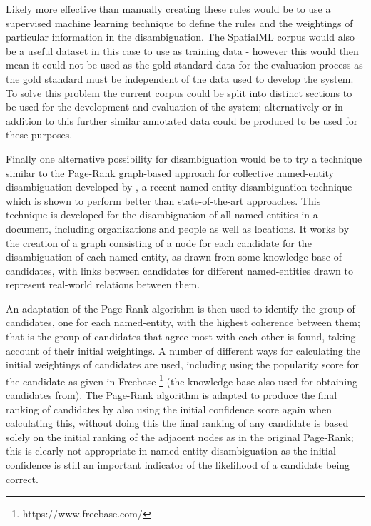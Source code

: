 \documentclass[12pt, a4paper]{report}
\begin{document}
Likely more effective than manually creating these rules would be to use a supervised machine learning technique to define the rules and the weightings of particular information in the disambiguation. The SpatialML corpus would also be a useful dataset in this case to use as training data - however this would then mean it could not be used as the gold standard data for the evaluation process as the gold standard must be independent of the data used to develop the system. To solve this problem the current corpus could be split into distinct sections to be used for the development and evaluation of the system; alternatively or in addition to this further similar annotated data could be produced to be used for these purposes.

Finally one alternative possibility for disambiguation would be to try a technique similar to the Page-Rank graph-based approach for collective named-entity disambiguation developed by \citet{alhelbawy2014}, a recent named-entity disambiguation technique which is shown to perform better than state-of-the-art approaches. This technique is developed for the disambiguation of all named-entities in a document, including organizations and people as well as locations. It works by the creation of a graph consisting of a node for each candidate for the disambiguation of each named-entity, as drawn from some knowledge base of candidates, with links between candidates for different named-entities drawn to represent real-world relations between them.

An adaptation of the Page-Rank algorithm is then used to identify the group of candidates, one for each named-entity, with the highest coherence between them; that is the group of candidates that agree most with each other is found, taking account of their initial weightings. A number of different ways for calculating the initial weightings of candidates are used, including using the popularity score for the candidate as given in Freebase \footnote{https://www.freebase.com/} (the knowledge base also used for obtaining candidates from). The Page-Rank algorithm is adapted to produce the final ranking of candidates by also using the initial confidence score again when calculating this, without doing this the final ranking of any candidate is based solely on the initial ranking of the adjacent nodes as in the original Page-Rank; this is clearly not appropriate in named-entity disambiguation as the initial confidence is still an important indicator of the likelihood of a candidate being correct.
\end{document}
